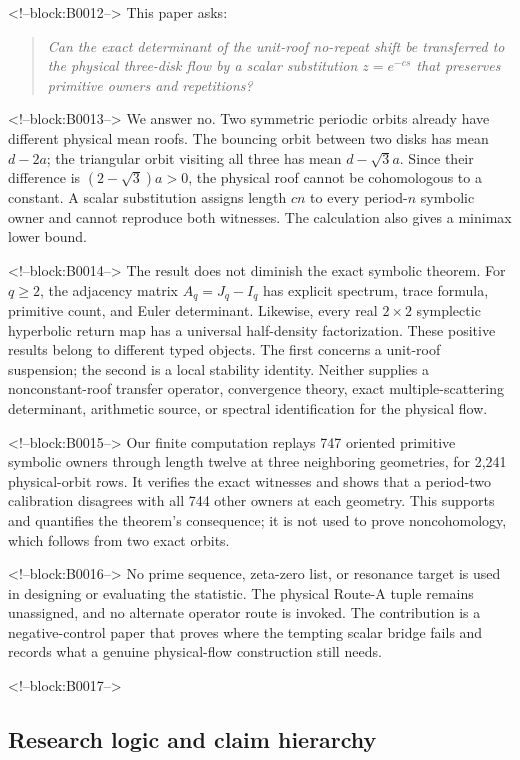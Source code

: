 \documentclass[11pt,a4paper]{article}
\theoremstyle{definition}
\theoremstyle{remark}
\begin{document}
<!--block:B0012-->
This paper asks:
\begin{quote}
\emph{Can the exact determinant of the unit-roof no-repeat shift be transferred to the physical three-disk flow by a scalar substitution \(z=e^{-cs}\) that preserves primitive owners and repetitions?}
\end{quote}

<!--block:B0013-->
We answer no. Two symmetric periodic orbits already have different physical mean roofs. The bouncing orbit between two disks has mean \(d-2a\); the triangular orbit visiting all three has mean \(d-\sqrt3a\). Since their difference is \((2-\sqrt3)a>0\), the physical roof cannot be cohomologous to a constant. A scalar substitution assigns length \(cn\) to every period-\(n\) symbolic owner and cannot reproduce both witnesses. The calculation also gives a minimax lower bound.

<!--block:B0014-->
The result does not diminish the exact symbolic theorem. For \(q\ge2\), the adjacency matrix \(A_q=J_q-I_q\) has explicit spectrum, trace formula, primitive count, and Euler determinant. Likewise, every real \(2\times2\) symplectic hyperbolic return map has a universal half-density factorization. These positive results belong to different typed objects. The first concerns a unit-roof suspension; the second is a local stability identity. Neither supplies a nonconstant-roof transfer operator, convergence theory, exact multiple-scattering determinant, arithmetic source, or spectral identification for the physical flow.

<!--block:B0015-->
Our finite computation replays 747 oriented primitive symbolic owners through length twelve at three neighboring geometries, for 2,241 physical-orbit rows. It verifies the exact witnesses and shows that a period-two calibration disagrees with all 744 other owners at each geometry. This supports and quantifies the theorem's consequence; it is not used to prove noncohomology, which follows from two exact orbits.

<!--block:B0016-->
No prime sequence, zeta-zero list, or resonance target is used in designing or evaluating the statistic. The physical Route-A tuple remains unassigned, and no alternate operator route is invoked. The contribution is a negative-control paper that proves where the tempting scalar bridge fails and records what a genuine physical-flow construction still needs.

<!--block:B0017-->
\subsection{Research logic and claim hierarchy}
\end{document}
